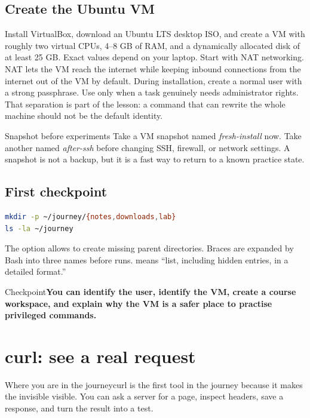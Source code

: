 \documentclass[11pt,a4paper,openany]{book}
\newcommand{\command}[1]{\texttt{\small\detokenize{#1}}}
\newcommand{\lesson}[1]{\begin{mentalbox}{Where you are in the journey}#1\end{mentalbox}}
\newcommand{\checkpoint}[1]{\begin{mentalbox}{Checkpoint}\textbf{#1}\end{mentalbox}}
\begin{document}
\section{Create the Ubuntu VM}
Install VirtualBox, download an Ubuntu LTS desktop ISO, and create a VM with roughly two virtual CPUs, 4--8 GB of RAM, and a dynamically allocated disk of at least 25 GB. Exact values depend on your laptop. Start with NAT networking. NAT lets the VM reach the internet while keeping inbound connections from the internet out of the VM by default.
During installation, create a normal user with a strong passphrase. Use \command{sudo} only when a task genuinely needs administrator rights. That separation is part of the lesson: a command that can rewrite the whole machine should not be the default identity.
\begin{mentalbox}{Snapshot before experiments}
Take a VM snapshot named \emph{fresh-install} now. Take another named \emph{after-ssh} before changing SSH, firewall, or network settings. A snapshot is not a backup, but it is a fast way to return to a known practice state.
\end{mentalbox}
\section{First checkpoint}
\begin{lstlisting}[language=bash]
mkdir -p ~/journey/{notes,downloads,lab}
ls -la ~/journey
\end{lstlisting}
The \command{-p} option allows \command{mkdir} to create missing parent directories. Braces are expanded by Bash into three names before \command{mkdir} runs. \command{ls -la} means ``list, including hidden entries, in a detailed format.''
\checkpoint{You can identify the user, identify the VM, create a course workspace, and explain why the VM is a safer place to practise privileged commands.}
\chapter{curl: see a real request}
\lesson{curl is the first tool in the journey because it makes the invisible visible. You can ask a server for a page, inspect headers, save a response, and turn the result into a test.}
\end{document}

